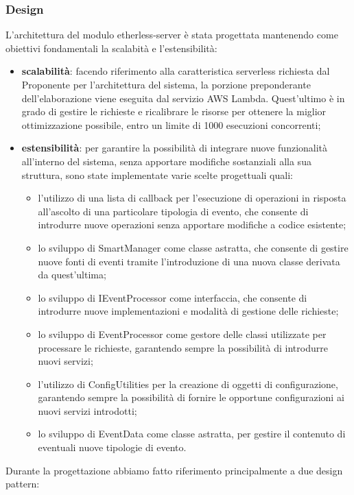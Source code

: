 \subsubsection{Design}
L'architettura del modulo etherless-server è stata progettata mantenendo come obiettivi fondamentali la scalabità e l'estensibilità:
\begin{itemize}
	\item \textbf{scalabilità}: facendo riferimento alla caratteristica serverless richiesta dal Proponente per l'architettura del sistema, la porzione preponderante dell'elaborazione viene eseguita dal servizio AWS Lambda. Quest'ultimo è in grado di gestire le richieste e ricalibrare le risorse per ottenere la miglior ottimizzazione possibile, entro un limite di 1000 esecuzioni concorrenti;
	\item \textbf{estensibilità}: per garantire la possibilità di integrare nuove funzionalità all'interno del sistema, senza apportare modifiche sostanziali alla sua struttura, sono state implementate varie scelte progettuali quali:
	\begin{itemize}
		\item l'utilizzo di una lista di callback per l'esecuzione di operazioni in risposta all'ascolto di una particolare tipologia di evento, che consente di introdurre nuove operazioni senza apportare modifiche a codice esistente;
		\item lo sviluppo di SmartManager come classe astratta, che consente di gestire nuove fonti di eventi tramite l'introduzione di una nuova classe derivata da quest'ultima;
		\item lo sviluppo di IEventProcessor come interfaccia, che consente di introdurre nuove implementazioni e modalità di gestione delle richieste;
		\item lo sviluppo di EventProcessor come gestore delle classi utilizzate per processare le richieste, garantendo sempre la possibilità di introdurre nuovi servizi;
		\item l'utilizzo di ConfigUtilities per la creazione di oggetti di configurazione, garantendo sempre la possibilità di fornire le opportune configurazioni ai nuovi servizi introdotti;
		\item lo sviluppo di EventData come classe astratta, per gestire il contenuto di eventuali nuove tipologie di evento.	
	\end{itemize}
\end{itemize}
Durante la progettazione abbiamo fatto riferimento principalmente a due design pattern:
